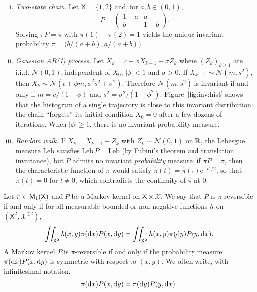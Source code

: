 \documentclass[english,graybox,envcountchap,envcountsame,sectrefs,shortlabels]{svmono}
\theoremstyle{style}
\newcommand{\rme}{\mathrm{e}}
\newcommand{\gauss}{\mathcal{N}}
\newcommand{\eqsp}{}
\newcommand{\Xset}{\mathsf{X}}
\newcommand{\Xsigma}{\mathcal{X}}
\begin{document}
\begin{example}
\label{ex:invariant}
\begin{enumerate}[i)]
\item \emph{Two-state chain.} Let $\Xset=\{1,2\}$ and, for $a,b\in(0,1)$,
$$
P = \begin{pmatrix} 1-a & a\\ b & 1-b\end{pmatrix}\eqsp.
$$
Solving $\pi P = \pi$ with $\pi(1)+\pi(2) = 1$ yields the unique invariant probability $\pi = \big(b/(a+b),a/(a+b)\big)$.
\item \emph{Gaussian AR(1) process.} Let $X_{k} = c + \phi X_{k-1} + \sigma Z_{k}$ where $(Z_k)_{k\geq 1}$ are i.i.d. $\gauss(0,1)$, independent of $X_0$, $|\phi|<1$ and $\sigma>0$. If $X_{k-1}\sim\gauss(m,s^2)$, then $X_k\sim\gauss(c+\phi m,\phi^2s^2+\sigma^2)$. Therefore $\gauss(m,s^2)$ is invariant if and only if $m = c/(1-\phi)$ and $s^2 = \sigma^2/(1-\phi^2)$. Figure~\ref{fig:inv:hist} shows that the histogram of a single trajectory is close to this invariant distribution: the chain ``forgets'' its initial condition $X_0=0$ after a few dozens of iterations. When $|\phi|\geq1$, there is no invariant probability measure.
\item \emph{Random walk.} If $X_{k} = X_{k-1}+Z_k$ with $Z_k\sim\gauss(0,1)$ on $\mathbb{R}$, the Lebesgue measure $\mathrm{Leb}$ satisfies $\mathrm{Leb}\,P = \mathrm{Leb}$ (by Fubini's theorem and translation invariance), but $P$ admits no invariant \emph{probability} measure: if $\pi P = \pi$, then the characteristic function of $\pi$ would satisfy $\hat\pi(t) = \hat\pi(t)\rme^{-t^2/2}$, so that $\hat\pi(t)=0$ for $t\neq0$, which contradicts the continuity of $\hat \pi$ at $0$.
\end{enumerate}
\end{example}

\begin{definition}
Let $\pi\in\meas 1(\Xset)$ and $P$ be a Markov kernel on $\Xset\times\Xsigma$.
We say that $P$ is $\pi$-reversible if and only if  for all measurable bounded or non-negative functions $h$
on $\left(\Xset^{2},\Xsigma^{\otimes2}\right)$,
\begin{equation}
\iint_{\Xset^{2}}h(x,y)\pi(\rmd x)P(x,\rmd y)=\iint_{\Xset^{2}}h(x,y)\pi(\rmd y)P(y,\rmd x).\label{eq:reversibility:h}
\end{equation}
A Markov kernel $P$ is $\pi$-reversible if and only
if the probability measure $\pi(\mathrm{d} x)P(x,\mathrm{d} y)$ is symmetric
with respect to $(x,y)$. We often write, with infinitesimal
notation,
\begin{equation}
\label{eq:reversibility}
\pi(\rmd x)P(x,\rmd y)=\pi(\rmd y)P(y,\rmd x)\eqsp.
\end{equation}
\end{definition}
\end{document}
